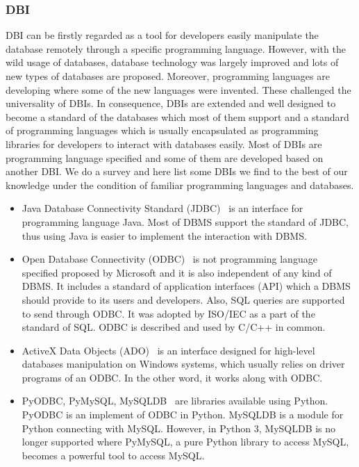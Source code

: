 \documentclass[onecolumn, conference, 12pt]{IEEEtran}
\begin{document}
	\subsubsection{DBI}
	DBI can be firstly regarded as a tool for developers easily manipulate the database remotely through a specific programming language. However, with the wild usage of databases, database technology was largely improved and lots of new types of databases are proposed. Moreover, programming languages are developing where some of the new languages were invented. These challenged the universality of DBIs. In consequence, DBIs are extended and well designed to become a standard of the databases which most of them support and a standard of programming languages which is usually encapsulated as programming libraries for developers to interact with databases easily. Most of DBIs are programming language specified and some of them are developed based on another DBI. We do a survey and here list some DBIs we find to the best of our knowledge under the condition of familiar programming languages and databases. 
	\begin{itemize}[]
		\item Java Database Connectivity Standard (JDBC)~\cite{JDBC} is an interface for programming language Java. Most of DBMS support the standard of JDBC, thus using Java is easier to implement the interaction with DBMS.
		\item Open Database Connectivity (ODBC)~\cite{ODBC} is not programming language specified proposed by Microsoft and it is also independent of any kind of DBMS. It includes a standard of application interfaces (API) which a DBMS should provide to its users and developers. Also, SQL queries are supported to send through ODBC. It was adopted by ISO/IEC as a part of the standard of SQL. ODBC is described and used by C/C++ in common.
		\item ActiveX Data Objects (ADO)~\cite{ADO} is an interface designed for high-level databases manipulation on Windows systems, which usually relies on driver programs of an ODBC. In the other word, it works along with ODBC.
		\item PyODBC, PyMySQL, MySQLDB~\cite{pyodbc,pymysql,mysqldb} are libraries available using Python. PyODBC is an implement of ODBC in Python. MySQLDB is a module for Python connecting with MySQL. However, in Python 3, MySQLDB is no longer supported where PyMySQL, a pure Python library to access MySQL, becomes a powerful tool to access MySQL.
	\end{itemize}
	
\end{document}

